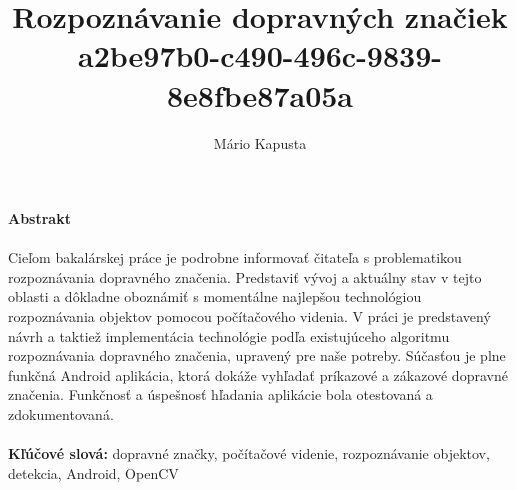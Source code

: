 \documentclass[12pt]{article}
\begin{document}
\title{Rozpoznávanie dopravných značiek\\a2be97b0-c490-496c-9839-8e8fbe87a05a}


\author{Mário Kapusta}
\maketitle
\thispagestyle{empty}
\clearpage
\tableofcontents
{}
\thispagestyle{empty}
\clearpage
\listoftables
\thispagestyle{empty}
\clearpage
\listoffigures
\thispagestyle{empty}
\clearpage

\centerline{\textbf{Abstrakt}}
\paragraph{}
Cieľom bakalárskej práce je podrobne informovať čitateľa s problematikou rozpoznávania dopravného značenia.
Predstaviť vývoj a aktuálny stav v tejto oblasti a dôkladne oboznámiť s momentálne najlepšou technológiou rozpoznávania objektov pomocou počítačového videnia.
V práci je predstavený návrh a taktiež implementácia technológie podľa existujúceho algoritmu rozpoznávania dopravného značenia, upravený pre naše potreby.
Súčasťou je plne funkčná Android aplikácia, ktorá dokáže vyhľadať príkazové a zákazové dopravné značenia. Funkčnosť a úspešnosť hľadania aplikácie bola otestovaná a zdokumentovaná.
\\\\
\textbf{Kľúčové slová:} dopravné značky, počítačové videnie, rozpoznávanie objektov, detekcia, Android, OpenCV
\clearpage
\end{document}
